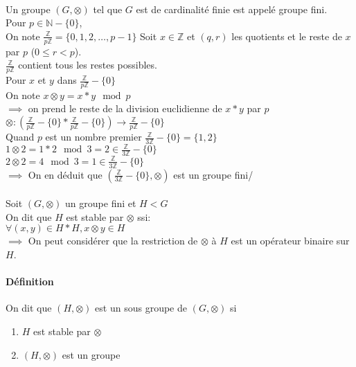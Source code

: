 \documentclass{report}
\newcommand{\Z}{\mathbb{Z}}
\newcommand{\N}{\mathbb{N}}
\begin{document}
\begin{itemize}
		\paragraph{}
		Un groupe $(G, \otimes)$ tel que $G$ est de cardinalité finie est appelé groupe fini.\\
		Pour $p \in \N-\{0\}$,\\
		On note $\frac{\Z}{p\Z}=\{0,1,2,\dots,p-1\}$
		Soit $x \in \Z$ et $(q,r)$ les quotients et le reste de $x$ par $p$ ($0\leq r < p$).\\
		$\frac{\Z}{p\Z}$ contient tous les restes possibles.\\
		Pour $x$ et $y$ dans $\frac{\Z}{p\Z}-\{0\}$ \\
		On note $x \otimes y = x*y \mod p$\\
		$\implies$ on prend le reste de la division euclidienne de $x*y$ par $p$\\
		$\otimes : (\frac{\Z}{p\Z}-\{0\}*\frac{\Z}{p\Z}-\{0\})\to \frac{\Z}{p\Z}-\{0\}$\\
		Quand $p$ est un nombre premier $\frac{\Z}{3\Z}-\{0\}=\{1,2\}$\\
		$1\otimes 2 = 1*2 \mod 3 = 2 \in \frac{\Z}{3\Z}-\{0\}$\\
		$2\otimes 2 = 4 \mod 3 = 1 \in \frac{\Z}{3\Z}-\{0\}$\\
		$\implies$ On en déduit que $(\frac{\Z}{3\Z}-\{0\},\otimes)$ est un groupe fini/
		\paragraph{}
		Soit $(G,\otimes)$ un groupe fini et $H < G$\\
		On dit que $H$ est stable par $\otimes$ ssi:\\
		$\forall(x,y) \in H*H, x \otimes y \in H$\\
		$\implies$ On peut considérer que la restriction de $\otimes$ à $H$ est un opérateur binaire sur $H$.
		\paragraph{Définition}
		On dit que $(H,\otimes)$ est un sous groupe de $(G,\otimes)$ si
		\begin{enumerate}
			\item $H$ est stable par $\otimes$
			\item $(H,\otimes)$ est un groupe
		\end{enumerate}
	\end{itemize}
\end{document}
